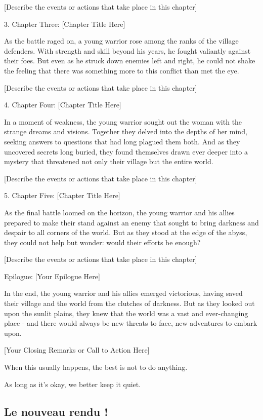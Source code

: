 \documentclass{mytex}
\begin{document}
   [Describe the events or actions that take place in this chapter]

3. Chapter Three: [Chapter Title Here]

   As the battle raged on, a young warrior rose among the ranks of the village defenders. With strength and skill beyond his years, he fought valiantly against their foes. But even as he struck down enemies left and right, he could not shake the feeling that there was something more to this conflict than met the eye.

   [Describe the events or actions that take place in this chapter]

4. Chapter Four: [Chapter Title Here]

   In a moment of weakness, the young warrior sought out the woman with the strange dreams and visions. Together they delved into the depths of her mind, seeking answers to questions that had long plagued them both. And as they uncovered secrets long buried, they found themselves drawn ever deeper into a mystery that threatened not only their village but the entire world.

   [Describe the events or actions that take place in this chapter]

5. Chapter Five: [Chapter Title Here]

   As the final battle loomed on the horizon, the young warrior and his allies prepared to make their stand against an enemy that sought to bring darkness and despair to all corners of the world. But as they stood at the edge of the abyss, they could not help but wonder: would their efforts be enough?

   [Describe the events or actions that take place in this chapter]

Epilogue: [Your Epilogue Here]

In the end, the young warrior and his allies emerged victorious, having saved their village and the world from the clutches of darkness. But as they looked out upon the sunlit plains, they knew that the world was a vast and ever-changing place - and there would always be new threats to face, new adventures to embark upon.

[Your Closing Remarks or Call to Action Here]

When this usually happens, the best is not to do anything.

As long as it's okay, we better keep it quiet.




\subsection{Le nouveau rendu !}
\end{document}
